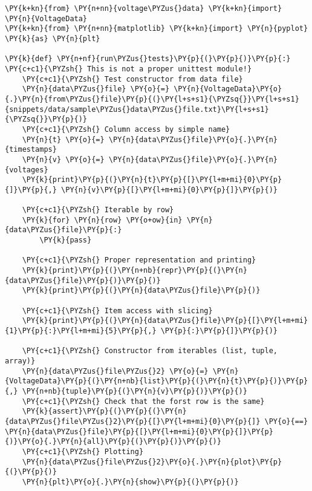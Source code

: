 \begin{Verbatim}[label=\makebox{\url{https://github.com/lucabaldini/cmepda/tree/master/slides/latex/snippets/test\_voltage\_data.py}},commandchars=\\\{\}]
\PY{k+kn}{from} \PY{n+nn}{voltage\PYZus{}data} \PY{k+kn}{import} \PY{n}{VoltageData}
\PY{k+kn}{from} \PY{n+nn}{matplotlib} \PY{k+kn}{import} \PY{n}{pyplot} \PY{k}{as} \PY{n}{plt}

\PY{k}{def} \PY{n+nf}{run\PYZus{}tests}\PY{p}{(}\PY{p}{)}\PY{p}{:} \PY{c+c1}{\PYZsh{} This is not a proper unittest module!}
    \PY{c+c1}{\PYZsh{} Test constructor from data file}
    \PY{n}{data\PYZus{}file} \PY{o}{=} \PY{n}{VoltageData}\PY{o}{.}\PY{n}{from\PYZus{}file}\PY{p}{(}\PY{l+s+s1}{\PYZsq{}}\PY{l+s+s1}{snippets/data/sample\PYZus{}data\PYZus{}file.txt}\PY{l+s+s1}{\PYZsq{}}\PY{p}{)}
    \PY{c+c1}{\PYZsh{} Column access by simple name}
    \PY{n}{t} \PY{o}{=} \PY{n}{data\PYZus{}file}\PY{o}{.}\PY{n}{timestamps}
    \PY{n}{v} \PY{o}{=} \PY{n}{data\PYZus{}file}\PY{o}{.}\PY{n}{voltages}
    \PY{k}{print}\PY{p}{(}\PY{n}{t}\PY{p}{[}\PY{l+m+mi}{0}\PY{p}{]}\PY{p}{,} \PY{n}{v}\PY{p}{[}\PY{l+m+mi}{0}\PY{p}{]}\PY{p}{)}
    
    \PY{c+c1}{\PYZsh{} Iterable by row}
    \PY{k}{for} \PY{n}{row} \PY{o+ow}{in} \PY{n}{data\PYZus{}file}\PY{p}{:}
        \PY{k}{pass}

    \PY{c+c1}{\PYZsh{} Proper representation and printing}
    \PY{k}{print}\PY{p}{(}\PY{n+nb}{repr}\PY{p}{(}\PY{n}{data\PYZus{}file}\PY{p}{)}\PY{p}{)}
    \PY{k}{print}\PY{p}{(}\PY{n}{data\PYZus{}file}\PY{p}{)}

    \PY{c+c1}{\PYZsh{} Item access with slicing}
    \PY{k}{print}\PY{p}{(}\PY{n}{data\PYZus{}file}\PY{p}{[}\PY{l+m+mi}{1}\PY{p}{:}\PY{l+m+mi}{5}\PY{p}{,} \PY{p}{:}\PY{p}{]}\PY{p}{)}

    \PY{c+c1}{\PYZsh{} Constructor from iterables (list, tuple, array)}
    \PY{n}{data\PYZus{}file\PYZus{}2} \PY{o}{=} \PY{n}{VoltageData}\PY{p}{(}\PY{n+nb}{list}\PY{p}{(}\PY{n}{t}\PY{p}{)}\PY{p}{,} \PY{n+nb}{tuple}\PY{p}{(}\PY{n}{v}\PY{p}{)}\PY{p}{)}
    \PY{c+c1}{\PYZsh{} Check that the forst row is the same}
    \PY{k}{assert}\PY{p}{(}\PY{p}{(}\PY{n}{data\PYZus{}file\PYZus{}2}\PY{p}{[}\PY{l+m+mi}{0}\PY{p}{]} \PY{o}{==} \PY{n}{data\PYZus{}file}\PY{p}{[}\PY{l+m+mi}{0}\PY{p}{]}\PY{p}{)}\PY{o}{.}\PY{n}{all}\PY{p}{(}\PY{p}{)}\PY{p}{)}
    \PY{c+c1}{\PYZsh{} Plotting}
    \PY{n}{data\PYZus{}file\PYZus{}2}\PY{o}{.}\PY{n}{plot}\PY{p}{(}\PY{p}{)}
    \PY{n}{plt}\PY{o}{.}\PY{n}{show}\PY{p}{(}\PY{p}{)}
\end{Verbatim}